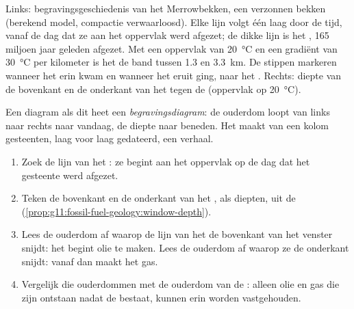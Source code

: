 \begin{omfigure}
{\small Links: begravingsgeschiedenis van het Merrowbekken, een verzonnen bekken (berekend
model, compactie verwaarloosd). Elke lijn volgt één laag door de tijd, vanaf
de dag dat ze aan het oppervlak werd afgezet; de dikke lijn is het ,
165 miljoen jaar geleden afgezet. Met een oppervlak van
\qty{20}{\degreeCelsius} en een gradiënt van \qty{30}{\degreeCelsius} per
kilometer is het  de band tussen \num{1.3} en
\qty{3.3}{km}. De stippen markeren wanneer het  erin kwam en wanneer het
eruit ging, naar het . Rechts: diepte van de bovenkant en de onderkant van het
 tegen de  (oppervlak op
\qty{20}{\degreeCelsius}).}
\end{omfigure}

Een diagram als dit heet een \emph{begravingsdiagram}: de ouderdom loopt van
links naar rechts naar vandaag, de diepte naar beneden. Het maakt van een kolom gesteenten,
laag voor laag gedateerd, een verhaal.

\begin{method}\label{met:g11:fossil-fuel-geology:burial}
\begin{enumerate}
  \item Zoek de lijn van het : ze begint aan het oppervlak op de
        dag dat het gesteente werd afgezet.
  \item Teken de bovenkant en de onderkant van het , als diepten, uit de
         (\cref{prop:g11:fossil-fuel-geology:window-depth}).
  \item Lees de ouderdom af waarop de lijn van het  de bovenkant van het
        venster snijdt: het  begint olie te maken. Lees de ouderdom af waarop ze
        de onderkant snijdt: vanaf dan maakt het gas.
  \item Vergelijk die ouderdommen met de ouderdom van de : alleen olie en gas
        die zijn ontstaan nadat de  bestaat, kunnen erin worden vastgehouden.
\end{enumerate}
\end{method}

